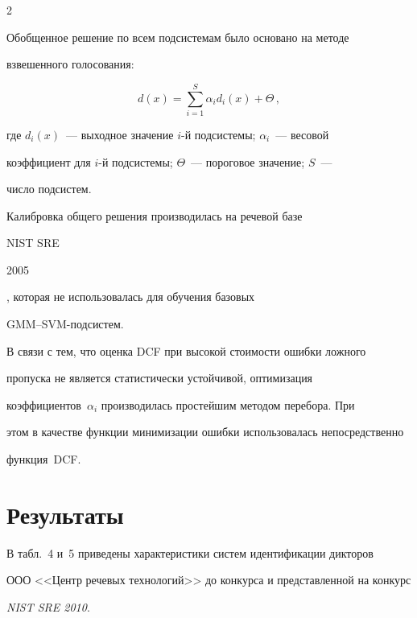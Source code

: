 \begin{multicols}{2}
  


  Обобщенное решение по всем подсистемам было основано на методе 


взвешенного голосования:





\noindent


  $$


  d(x) =\sum\limits_{i=1}^S \alpha_i d_i(x)+\Theta\,,


  $$


  где $d_i(x)$~--- выходное значение $i$-й подсистемы; $\alpha_i$~--- весовой 


коэффициент для $i$-й подсистемы; $\Theta$~--- пороговое значение; $S$~--- 


чис\-ло подсистем.


  


  Калибровка общего решения производилась на речевой базе {NIST SRE 


2005}, которая не использовалась для обучения базовых 


GMM--SVM-под\-систем.


  


  В связи с тем, что оценка DCF при высокой стоимости ошибки ложного 


пропуска не является статистически устойчивой, оптимизация 


коэффициентов~$\alpha_i$ производилась простейшим методом перебора. При 


этом в качестве функции минимизации ошибки использовалась непосредственно 


функция~DCF.





\vspace*{-6pt}





\section{Результаты}


  


  В табл.~4 и~5 приведены характеристики сис\-тем идентификации дикторов 


ООО <<Центр речевых технологий>> до конкурса и представленной на конкурс 


\textit{NIST SRE 2010}. 









\end{multicols}
